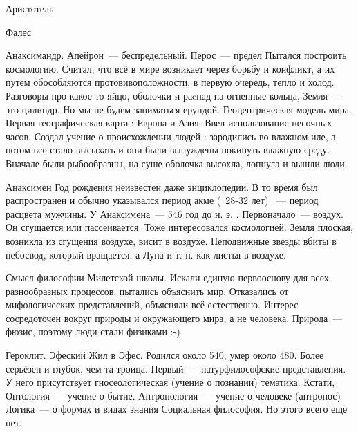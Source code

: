 Аристотель

Фалес

Анаксимандр. 
Апейрон~--- беспредельный. Перос~--- предел
Пытался построить космологию. Считал, что всё в мире возникает через борьбу и конфликт, а их путем обособляются протовивоположности, в первую очередь, тепло и холод. 
Разговоры про какое-то яйцо, оболочки и раcпад на огненные кольца, Земля~--- это цилиндр. 
Но мы не будем заниматься ерундой. 
Геоцентрическая модель мира. Первая географическая карта : Европа и Азия. Ввел использование песочных часов. 
Создал учение о происхождении людей : зародились во влажном иле, а потом все стало высыхать и они были вынуждены покинуть влажную среду. Вначале были рыбообразны, на суше оболочка высохла, лопнула и вышли люди. 

Анаксимен
Год рождения неизвестен даже энциклопедии. 
В то время был распространен и обычно указывался период акме (~28-32 лет) ~--- период расцвета мужчины. 
У Анаксимена~--- 546 год до н. э. . 
Первоначало~--- воздух. Он сгущается или пассеивается. 
Тоже интересовался космологией. Земля плоская, возникла из сгущения воздухе, висит в воздухе. 
Неподвижные звезды вбиты в небосвод, который вращается, а Луна и т. п. как листья в воздухе. 

Смысл философии Милетской школы. 
Искали единую первооснову для всех разнообразных процессов, пытались объяснить мир. 
Отказались от мифологических представлений, объясняли всё естественно. 
Интерес сосредоточен вокруг природы и окружающего мира, а не человека. Природа~--- фюзис, поэтому люди стали физиками :-) 

Героклит. Эфеский
Жил в Эфес. Родился около 540, умер около 480. Более серьёзен и глубок, чем та троица. 
Первый~--- натурфилософские представления. У него присутствует гносеологическая (учение о познании) тематика. 
Кстати, 
Онтология~--- учение о бытие. 
Антропология~--- учение о человеке (антропос) 
Логика~--- о формах и видах знания
Социальная философия. Но этого всего еще нет. 

